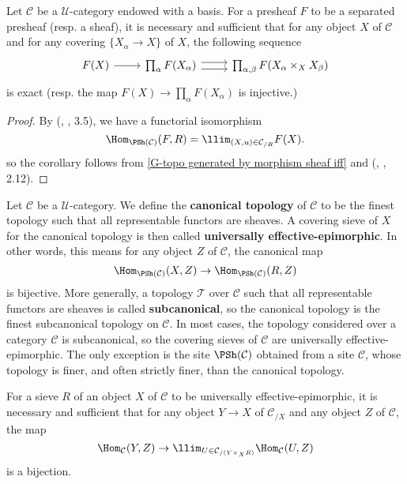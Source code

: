 \begin{corollary}\label{G-topo generated by basis sheaf iff}
Let $\mathcal{C}$ be a $\mathscr{U}$-category endowed with a basis. For a presheaf $F$ to be a separated presheaf (resp. a sheaf), it is necessary and sufficient that for any object $X$ of $\mathcal{C}$ and for any covering $\{X_\alpha\to X\}$ of $X$, the following sequence
\[\begin{tikzcd}
F(X)\ar[r]&\prod_{\alpha}F(X_\alpha)\ar[r,shift left=3pt]\ar[r,shift right=3pt]&\prod_{\alpha,\beta}F(X_\alpha\times_XX_\beta)
\end{tikzcd}\]
is exact (resp. the map $F(X)\to \prod_\alpha F(X_\alpha)$ is injective.)
\end{corollary}
\begin{proof}
By (\cite{SGA4-1}, , 3.5), we have a functorial isomorphism 
\[\Hom_{\PSh(\mathcal{C})}(F,R)=\llim_{(X,u)\in\mathcal{C}_{/R}}F(X).\]
so the corollary follows from \cref{G-topo generated by morphism sheaf iff} and (\cite{SGA4-1}, , 2.12).
\end{proof}
Let $\mathcal{C}$ be a $\mathscr{U}$-category. We define the \textbf{canonical topology} of $\mathcal{C}$ to be the finest topology such that all representable functors are sheaves. A covering sieve of $X$ for the canonical topology is then called \textbf{universally effective-epimorphic}. In other words, this means for any object $Z$ of $\mathcal{C}$, the canonical map
\[\Hom_{\PSh(\mathcal{C})}(X,Z)\to \Hom_{\PSh(\mathcal{C})}(R,Z)\]
is bijective. More generally, a topology $\mathcal{T}$ over $\mathcal{C}$ such that all representable functors are sheaves is called \textbf{subcanonical}, so the canonical topology is the finest subcanonical topology on $\mathcal{C}$. In most cases, the topology considered over a category $\mathcal{C}$ is subcanonical, so the covering sieves of $\mathcal{C}$ are universally effective-epimorphic. The only exception is the site $\PSh(\mathcal{C})$ obtained from a site $\mathcal{C}$, whose topology is finer, and often strictly finer, than the canonical topology.
\begin{proposition}\label{G-topo sieve universal effective epi iff}
For a sieve $R$ of an object $X$ of $\mathcal{C}$ to be universally effective-epimorphic, it is necessary and sufficient that for any object $Y\to X$ of $\mathcal{C}_{/X}$ and any object $Z$ of $\mathcal{C}$, the map
\[\Hom_{\mathcal{C}}(Y,Z)\to \llim_{U\in\mathcal{C}_{/(Y\times_XR)}}\Hom_\mathcal{C}(U,Z)\]
is a bijection.
\end{proposition}
